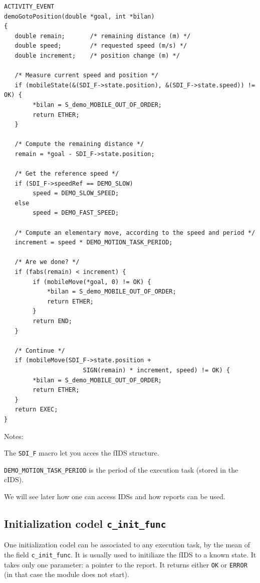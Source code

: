 \begin{center}\begin{cartouche}\small\begin{verbatim}
ACTIVITY_EVENT
demoGotoPosition(double *goal, int *bilan)
{
   double remain;       /* remaining distance (m) */
   double speed;        /* requested speed (m/s) */
   double increment;    /* position change (m) */

   /* Measure current speed and position */
   if (mobileState(&(SDI_F->state.position), &(SDI_F->state.speed)) != OK) {
        *bilan = S_demo_MOBILE_OUT_OF_ORDER;
        return ETHER;
   }

   /* Compute the remaining distance */
   remain = *goal - SDI_F->state.position;

   /* Get the reference speed */
   if (SDI_F->speedRef == DEMO_SLOW) 
        speed = DEMO_SLOW_SPEED;
   else
        speed = DEMO_FAST_SPEED;

   /* Compute an elementary move, according to the speed and period */
   increment = speed * DEMO_MOTION_TASK_PERIOD;

   /* Are we done? */
   if (fabs(remain) < increment) {
        if (mobileMove(*goal, 0) != OK) {
            *bilan = S_demo_MOBILE_OUT_OF_ORDER;
            return ETHER;
        }
        return END;
   }

   /* Continue */
   if (mobileMove(SDI_F->state.position +
                      SIGN(remain) * increment, speed) != OK) {
        *bilan = S_demo_MOBILE_OUT_OF_ORDER;
        return ETHER;
   }
   return EXEC;
}
\end{verbatim}\end{cartouche}\end{center}

Notes:

The {\tt SDI\_F} macro let you acces the fIDS structure.

{\tt DEMO\_MOTION\_TASK\_PERIOD} is the period of the execution task
(stored in the cIDS).

We will see later how one can access IDSs and how reports can be used.


\subsection{Initialization codel {\tt c\_init\_func}}

One initialization codel can be associated to any  execution task, by the
mean of the field {\tt  c\_init\_func}. It is  usually used to initiliaze
the fIDS to a known state. It takes only one  parameter: a pointer to the
report.   It returns either {\tt  OK}  or {\tt ERROR}  (in  that case the
module does not start).

